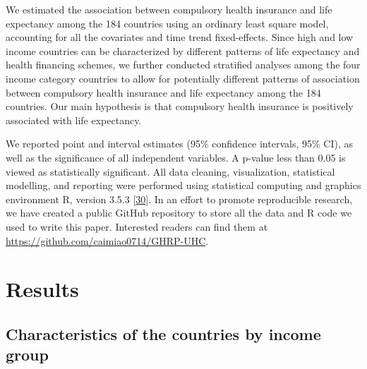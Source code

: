 \documentclass[]{elsarticle} %
\begin{document}
We estimated the association between compulsory health insurance and life expectancy among the 184 countries using an ordinary least square model, accounting for all the covariates and time trend fixed-effects.
Since high and low income countries can be characterized by different patterns of life expectancy and health financing schemes, we further conducted stratified analyses among the four income category countries to allow for potentially different patterns of association between compulsory health insurance and life expectancy among the 184 countries.
Our main hypothesis is that compulsory health insurance is positively associated with life expectancy.

We reported point and interval estimates (95\% confidence intervals, 95\% CI), as well as the significance of all independent variables.
A p-value less than 0.05 is viewed as statistically significant.
All data cleaning, visualization, statistical modelling, and reporting were performed using statistical computing and graphics environment R, version 3.5.3 {[}\protect\hyperlink{ref-R353}{30}{]}.
In an effort to promote reproducible research, we have created a public GitHub repository to store all the data and R code we used to write this paper.
Interested readers can find them at \url{https://github.com/caimiao0714/GHRP-UHC}.

\hypertarget{results}{%
\section{Results}\label{results}}

\hypertarget{characteristics-of-the-countries-by-income-group}{%
\subsection{Characteristics of the countries by income group}\label{characteristics-of-the-countries-by-income-group}}
\end{document}
